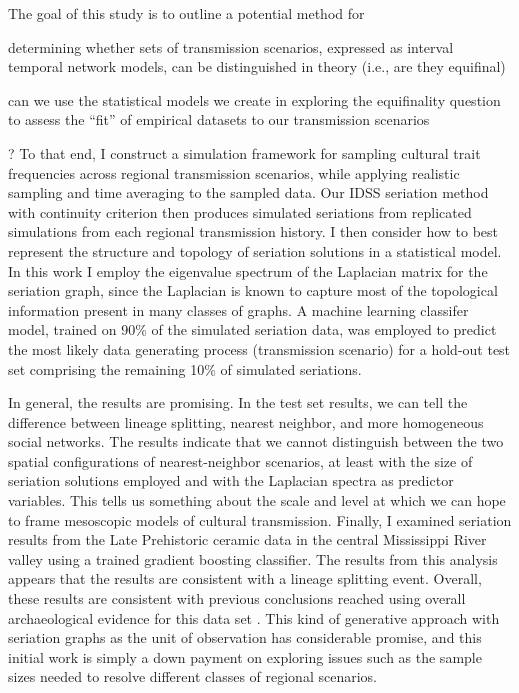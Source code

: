 The goal of this study is to outline a potential method for \begin{dissparalist}
\item determining whether sets of transmission scenarios, expressed as interval temporal network models, can be distinguished in theory (i.e., are they equifinal)
\item can we use the statistical models we create in exploring the equifinality question to assess the ``fit'' of empirical datasets to our transmission scenarios
\end{dissparalist}?  To that end, I construct a simulation framework for sampling cultural trait frequencies across regional transmission scenarios, while applying realistic sampling and time averaging to the sampled data.  Our IDSS seriation method with continuity criterion then produces simulated seriations from replicated simulations from each regional transmission history.  I then consider how to best represent the structure and topology of seriation solutions in a statistical model.  In this work I employ the eigenvalue spectrum of the Laplacian matrix for the seriation graph, since the Laplacian is known to capture most of the topological information present in many classes of graphs.  A machine learning classifer model, trained on 90\% of the simulated seriation data, was employed to predict the most likely data generating process (transmission scenario) for a hold-out test set comprising the remaining 10\% of simulated seriations.  

In general, the results are promising. In the test set results, we can tell the difference between lineage splitting, nearest neighbor, and more homogeneous social networks.  The results indicate that we cannot distinguish between the two spatial configurations of nearest-neighbor scenarios, at least with the size of seriation solutions employed and with the Laplacian spectra as predictor variables.  This tells us something about the scale and level at which we can hope to frame mesoscopic models of cultural transmission.   Finally, I examined seriation results from the Late Prehistoric ceramic data in the central Mississippi River valley using a trained gradient boosting classifier.  The results from this analysis appears that the results are consistent with a lineage splitting event.  Overall, these results are consistent with previous conclusions reached using overall archaeological evidence for this data set \citep{Lipo2001}. This kind of generative approach with seriation graphs as the unit of observation has considerable promise, and this initial work is simply a down payment on exploring issues such as the sample sizes needed to resolve different classes of regional scenarios.


